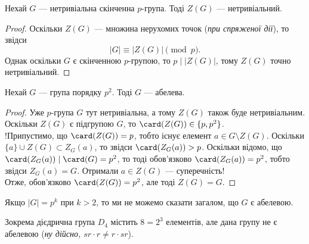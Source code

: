 \documentclass{math_library}
\begin{document}
\begin{corollary}
Нехай $G$ --- нетривіальна скінченна $p$-група. Тоді $Z(G)$ --- нетривіальний.
\end{corollary}

\begin{proof}
Оскільки $Z(G)$ --- множина нерухомих точок (\textit{при спряженої дії}), то звідси 
\[
|G| \equiv |Z(G)| \pmod p.
\]
Однак оскільки $G$ є скінченною $p$-групою, то $p \mid |Z(G)|$, тому $Z(G)$ точно нетривіальний.
\end{proof}

\begin{corollary}
Нехай $G$ --- група порядку $p^2$. Тоді $G$ --- абелева.
\end{corollary}

\begin{proof}
Уже $p$-група $G$ тут нетривіальна, а тому $Z(G)$ також буде нетривіальним. Оскільки $Z(G)$ є підгрупою $G$, то $\card(Z(G)) \in \{p,p^2\}$.\\
!Припустимо, що $\card(Z(G)) = p$, тобто існує елемент $a \in G \setminus Z(G)$. Оскільки $\{a\} \cup Z(G) \subset Z_G(a)$, то звідси $\card(Z_G(a)) > p$. Оскільки відомо, що $\card(Z_G(a)) \mid \card(G) = p^2$, то тоді обов'язково $\card(Z_G(a)) = p^2$, тобто звідси $Z_G(a) = G$. Отримали $a \in Z(G)$ --- суперечність!\\
Отже, обов'язково $\card(Z(G)) = p^2$, але тоді $Z(G) = G$.
\end{proof}

\begin{remark}
Якщо $|G| = p^k$ при $k > 2$, то ми не можемо сказати загалом, що $G$ є абелевою.
\end{remark}

\begin{example}
Зокрема дієдрична група $D_4$ містить $8 = 2^3$ елементів, але дана групу не є абелевою (\textit{ну дійсно, $sr \cdot r \neq r \cdot sr$}).
\end{example}
\end{document}
